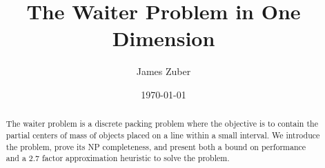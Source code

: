 \documentclass[11pt,twocolumn]{article}
\author{James Zuber}
\title{The Waiter Problem in One Dimension}
\date{\today}
\begin{document}
\maketitle

\begin{abstract}
The waiter problem is a discrete packing problem where the objective is to contain the partial centers of mass of objects placed on a line within a small interval.  We introduce the problem, prove its NP completeness, and present both a bound on performance and a 2.7 factor approximation heuristic to solve the problem.
\end{abstract}




{}
\end{document}
